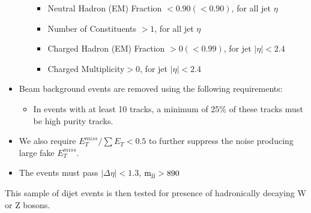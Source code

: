 \begin{itemize}
\begin{itemize}
                 \begin{itemize}
                     \item   Neutral Hadron (EM) Fraction $< 0.90 (< 0.90)$, for all jet $\eta$
                     \item   Number of Constituents $> 1$, for all jet $\eta$
                     \item   Charged Hadron (EM) Fraction $> 0 (< 0.99)$, for jet $|\eta| < 2.4$
                     \item   Charged Multiplicity$ > 0$, for jet $|\eta| < 2.4$
                 \end{itemize}
        \end{itemize}
\item Beam background events are removed using the following requirements:
        \begin{itemize}
        \item In events with at least 10 tracks, a minimum of 25\% of
          these tracks must be high purity tracks.
        \end{itemize}
\item  We also require $E_{T}^{miss}/\sum{E_{T}} < 0.5$ to further suppress the noise producing large fake $E_{T}^{miss}$. 
\item The events must pass $|\Delta\eta|<1.3$, ${\rm m_{jj} > 890}$\GeVcc
\end{itemize}

This sample of dijet events is then tested for presence of
hadronically decaying W or Z bosons.
